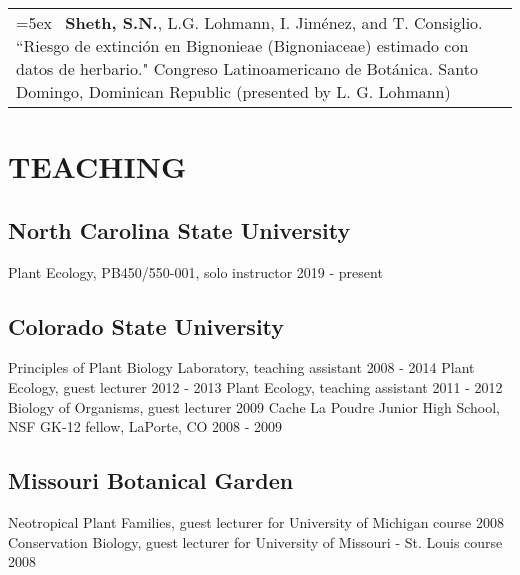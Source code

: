 \documentclass[11pt,english]{article}\usepackage[]{graphicx}\usepackage[]{xcolor}
\providecommand{\tabularnewline}{\\}
\begin{document}
\renewcommand{\arraystretch}{1.2}
\begin{tabularx}{\textwidth}{@{}>{\raggedright}p{5.25in} >{\raggedleft}X@{}}

\hangindent=5ex \ \textbf{Sheth, S.N.}, L.G. Lohmann, I. Jim\'enez, and T. Consiglio. ``Riesgo de extinci\'on en Bignonieae (Bignoniaceae) estimado con datos de herbario." Congreso Latinoamericano de Bot\'anica. Santo Domingo, Dominican Republic (presented by L. G. Lohmann) & 2006 \tabularnewline 

\end{tabularx}

\section*{TEACHING}

\subsection*{North Carolina State University}
Plant Ecology, PB450/550-001, solo instructor \hfill {2019 - present} 

\subsection*{Colorado State University}
Principles of Plant Biology Laboratory, teaching assistant \hfill {2008 - 2014} \newline
Plant Ecology, guest lecturer \hfill {2012 - 2013} \newline
Plant Ecology, teaching assistant \hfill {2011 - 2012} \newline
Biology of Organisms, guest lecturer \hfill {2009} \newline
Cache La Poudre Junior High School, NSF GK-12 fellow, LaPorte, CO \hfill {2008 - 2009}

\subsection*{Missouri Botanical Garden}
Neotropical Plant Families, guest lecturer for University of Michigan course \hfill {2008} \newline
Conservation Biology, guest lecturer for University of Missouri - St. Louis course \hfill {2008} 
\end{document}
